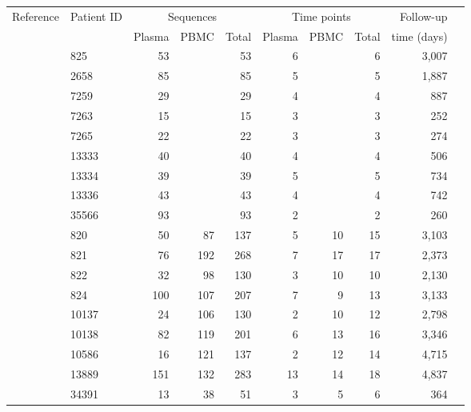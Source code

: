 \documentclass{bmcart}
\begin{document}
\begin{table}
\def\arraystretch{1.3}%
\begin{center}
\begin{tabular}{llrrrrrrrr} 

Reference & Patient ID & \multicolumn{3}{c}{Sequences} & \multicolumn{3}{c}{Time points} & Follow-up \\
 &  & Plasma & PBMC & Total & Plasma & PBMC & Total & time (days) \\
\hline
\cite{McCloskey14} & 825 & 53 & & 53 & 6 & & 6 & 3,007 \\ %
& 2658 & 85 & & 85 & 5 & & 5 & 1,887 \\ %
& 7259 & 29 & & 29 & 4 & & 4 & 887 \\ %
& 7263 & 15 & & 15 & 3 & & 3 & 252 \\ %
& 7265 & 22 & & 22 & 3 & & 3 & 274 \\ %
& 13333 & 40 & & 40 & 4 & & 4 & 506 \\ %
& 13334 & 39 & & 39 & 5 & & 5 & 734 \\ %
& 13336 & 43 & & 43 & 4 & & 4 & 742 \\ %
& 35566 & 93 & & 93 & 2 & & 2 & 260 \\ %
\hline
\cite{Shankarappa99} & 820 &       50 &       87 &      137 &        5 &       10 &       15 & 3,103   \\
& 821 &      76 &      192 &      268 &        7 &       17 &       17 & 2,373 \\ 
& 822 &      32 &       98 &      130 &        3 &       10 &       10 & 2,130 \\ 
& 824 &     100 &      107 &      207 &        7 &        9 &       13 & 3,133 \\
& 10137 &     24 &      106 &      130 &        2 &       10 &       12 & 2,798 \\
& 10138 &     82 &      119 &      201 &        6 &       13 &       16 & 3,346 \\
& 10586 &     16 &      121 &      137 &        2 &       12 &       14 & 4,715 \\ 
& 13889 &    151 &      132 &      283 &       13 &       14 &       18 & 4,837 \\
\cite{Novitsky09}%
& 34391 &     13 &       38 &       51 &        3 &        5 &        6 & 364 \\

\end{tabular}
\end{center}
\end{table}
\end{document}
